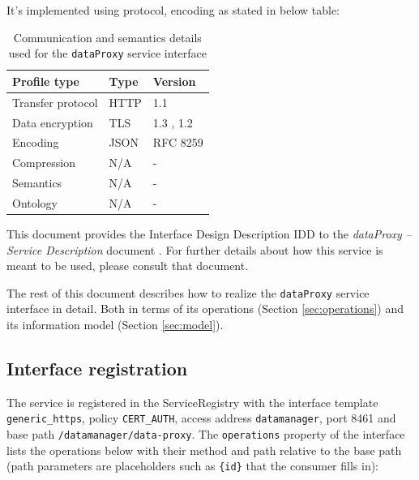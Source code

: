 \documentclass[a4paper]{arrowhead}
\begin{document}
It's implemented using protocol, encoding as stated in below table:
\begin{table}[ht!]
  \centering
  \begin{tabular}{|l|l|l|}
    \hline
    \rowcolor{gray!33} Profile type & Type & Version \\ \hline
    Transfer protocol & HTTP & 1.1 \cite{rfc9112} \\ \hline
    Data encryption & TLS & 1.3 \cite{rfc8446}, 1.2 \cite{rfc5246} \\ \hline
    Encoding & JSON & RFC 8259 \cite{rfc8259} \\ \hline
    Compression & N/A & - \\ \hline
    Semantics & N/A & - \\ \hline
    Ontology & N/A & - \\ \hline
  \end{tabular}
  \caption{Communication and semantics details used for the \texttt{dataProxy} service interface}
  \label{tab:comunication_semantics_profile}
\end{table}

This document provides the Interface Design Description IDD to the \textit{dataProxy -- Service Description} document \cite{dm-dataProxy-sd}.
For further details about how this service is meant to be used, please consult that document.

The rest of this document describes how to realize the \texttt{dataProxy} service
interface in detail. Both in terms of its operations (Section \ref{sec:operations}) and its information model (Section \ref{sec:model}).

\subsection{Interface registration}

The service is registered in the ServiceRegistry with the interface template \texttt{generic\_\allowbreak{}https}, policy \texttt{CERT\_\allowbreak{}AUTH}, access address \texttt{datamanager}, port 8461 and base path \texttt{/\allowbreak{}datamanager/\allowbreak{}data-\allowbreak{}proxy}. The \texttt{operations} property of the interface lists the operations below with their method and path relative to the base path (path parameters are placeholders such as \texttt{\{id\}} that the consumer fills in):
\end{document}
